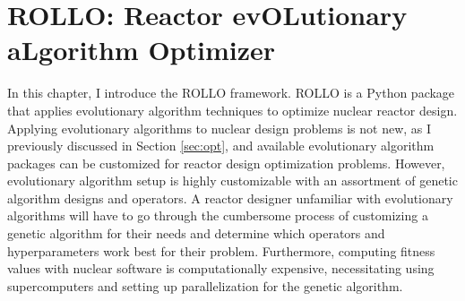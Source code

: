 \chapter{ROLLO: Reactor evOLutionary aLgorithm Optimizer}
\label{chap:rollo}
In this chapter, I introduce the \gls{ROLLO} framework. 
\gls{ROLLO} is a Python package that applies evolutionary algorithm 
techniques to optimize nuclear reactor design. 
Applying evolutionary algorithms to nuclear design problems is not new, as I
previously discussed in Section \ref{sec:opt}, and available evolutionary algorithm 
packages can be customized for reactor design optimization problems. 
However, evolutionary algorithm setup is highly customizable with
an assortment of genetic algorithm designs and operators.
A reactor designer unfamiliar with evolutionary algorithms will have
to go through the cumbersome process of customizing a genetic algorithm 
for their needs and determine which operators and hyperparameters work best for 
their problem. 
Furthermore, computing fitness values with nuclear software is computationally 
expensive, necessitating using supercomputers and setting up parallelization 
for the genetic algorithm.


